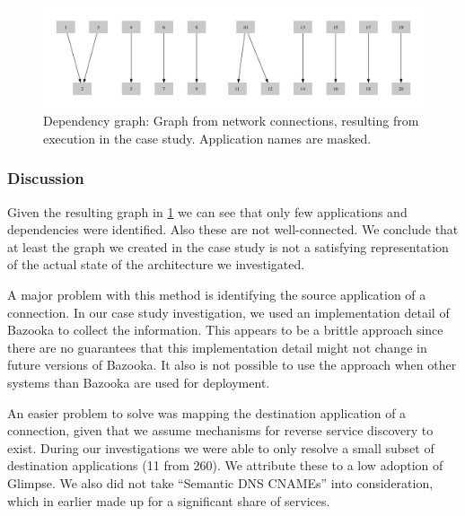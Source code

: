 \begin{figure}[h]
  \begin{center}
    \includegraphics[width=1\textwidth]{images/from-network-connections.pdf}
  \end{center}
  \caption{Dependency graph: Graph from network connections, resulting from execution in the case study. Application names are masked.}
  \label{fig:graph_from_network}
\end{figure}

\subsubsection{Discussion}

Given the resulting graph in \ref{fig:graph_from_network} we can see that only few applications and dependencies were identified. Also these are not well-connected. We conclude that at least the graph we created in the case study is not a satisfying representation of the actual state of the architecture we investigated.

A major problem with this method is identifying the source application of a connection. In our case study investigation, we used an implementation detail of Bazooka to collect the information. This appears to be a brittle approach since there are no guarantees that this implementation detail might not change in future versions of Bazooka. It also is not possible to use the approach when other systems than Bazooka are used for deployment.

An easier problem to solve was mapping the destination application of a connection, given that we assume mechanisms for reverse service discovery to exist. During our investigations we were able to only resolve a small subset of destination applications (11 from 260). We attribute these to a low adoption of Glimpse. We also did not take ``Semantic DNS CNAMEs'' into consideration, which in earlier  made up for a significant share of services.



